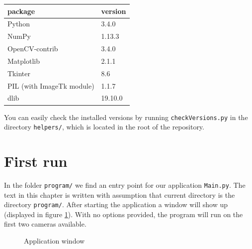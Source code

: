 \begin{center}
\begin{tabular}{l l}
	package	&	version 	\\ \hline
	Python	&	3.4.0 		\\
	NumPy	&	1.13.3 		\\
	OpenCV-contrib	&	3.4.0 	\\ 
	Matplotlib &	2.1.1 		\\
	Tkinter	&	8.6 		\\
	PIL (with ImageTk module)	&	1.1.7 		\\
	dlib	&	19.10.0
\end{tabular}
\end{center}

You can easily check the installed versions by running \verb+checkVersions.py+ in
the directory \verb+helpers/+, which is located in the root of the repository.

\section{First run}

In the folder \verb+program/+ we find an entry point for our application
\verb+Main.py+. The text in this chapter is written with assumption that
current directory is the directory \verb+program/+. After starting the
application a window will show up (displayed in figure \ref{fig:application}).
With no options provided, the program will run on the first two cameras
available.

\begin{figure}
	\caption{Application window}
	\label{fig:application}
\end{figure}

